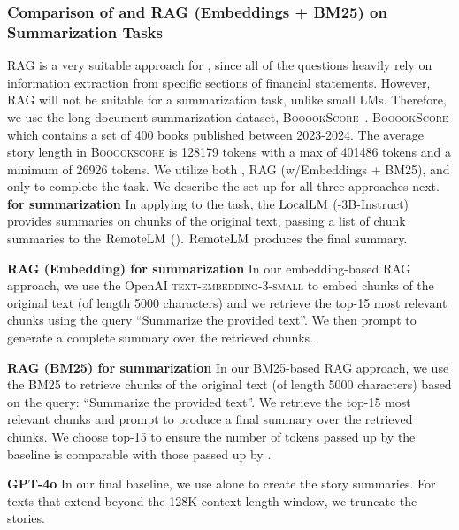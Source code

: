 \subsubsection{Comparison of \system and RAG (Embeddings + BM25) on Summarization Tasks}\label{app:rag:summary}
RAG is a very suitable approach for \finance, since all of the questions heavily rely on information extraction from specific sections of financial statements. However, RAG will not be suitable for a summarization task, unlike small LMs. Therefore, we use the long-document summarization dataset, \textsc{BooookScore}~\citep{chang2023booookscore}. \textsc{BooookScore} which contains a set of 400 books published between 2023-2024. The average story length in \textsc{Booookscore} is 128179 tokens with a max of 401486 tokens and a minimum of 26926 tokens. We utilize both \system, RAG (w/Embeddings + BM25), and \gpt only to complete the task. We describe the set-up for all three approaches next.
\\

\textbf{\system for summarization} In applying \system to the task, the $\mathrm{LocalLM}$ (\llamathreetwo-3B-Instruct) provides summaries on chunks of the original text, passing a list of chunk summaries to the $\mathrm{RemoteLM}$ (\gpt). $\mathrm{RemoteLM}$ produces the final summary. 

\textbf{RAG (Embedding) for summarization} In our embedding-based RAG approach, we use the OpenAI \textsc{text-embedding-3-small} to embed chunks of the original text (of length 5000 characters) and we retrieve the top-15 most relevant chunks using the query ``Summarize the provided text''. We then prompt \gpt to generate a complete summary over the retrieved chunks.

\textbf{RAG (BM25) for summarization} In our BM25-based RAG approach, we use the BM25 to retrieve chunks of the original text (of length 5000 characters) based on the query: ``Summarize the provided text''. We retrieve the top-15 most relevant chunks and prompt \gpt to produce a final summary over the retrieved chunks. We choose top-15 to ensure the number of tokens passed up by the baseline is comparable with those passed up by \system.

\textbf{GPT-4o} In our final baseline, we use \gpt alone to create the story summaries. For texts that extend beyond the 128K context length window, we truncate the stories.

